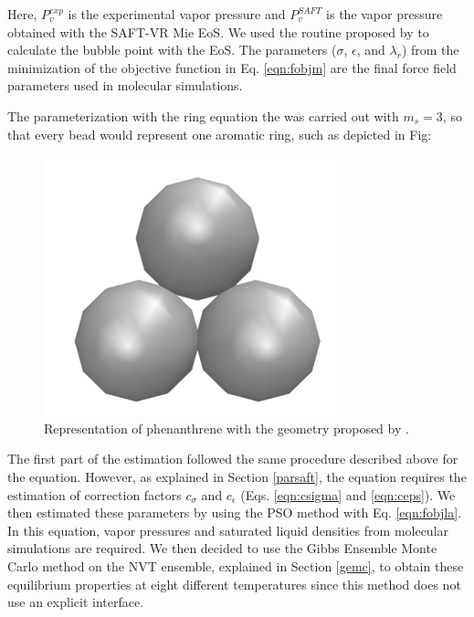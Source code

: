Here, $P_{v}^{exp}$ is the experimental vapor pressure and $P_{v}^{SAFT}$ is the vapor pressure obtained with the SAFT-VR Mie EoS. We used the routine proposed by   to calculate the bubble point with the EoS. The parameters ($\sigma$, $\epsilon $, and $\lambda _{r}$) from the minimization of the objective function in Eq. \eqref{eqn:fobjm} are the final force field parameters used in molecular simulations. 

The parameterization with the ring equation the  was carried out with $m_{s}=3$, so that every bead would represent one aromatic ring, such as depicted in Fig:

\begin{figure}[th]
	\centering
	\includegraphics[width=0.15\linewidth]{Figures/fe3}
	\caption{Representation of phenanthrene with the geometry proposed by .}
	\label{fig:fen3}
\end{figure}

The first part of the estimation followed the same procedure described above for the  equation. However, as explained in Section \ref{parsaft}, the  equation requires the estimation of correction factors $c_{\sigma}$ and $c_{\epsilon}$ (Eqs. \eqref{eqn:csigma} and \eqref{eqn:ceps}). We then estimated these parameters by using the PSO method with Eq. \eqref{eqn:fobjla}. In this equation, vapor pressures and saturated liquid densities from molecular simulations are required. We then decided to use the Gibbs Ensemble Monte Carlo method on the NVT ensemble, explained in Section \ref{gemc}, to obtain these equilibrium properties at eight different temperatures since this method does not use an explicit interface.


